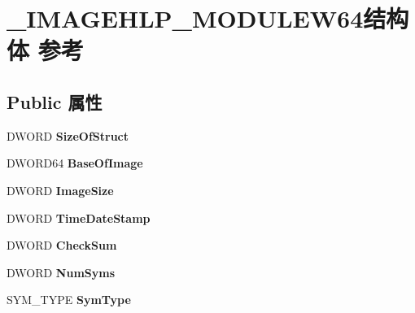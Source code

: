 \hypertarget{struct___i_m_a_g_e_h_l_p___m_o_d_u_l_e_w64}{}\section{\+\_\+\+I\+M\+A\+G\+E\+H\+L\+P\+\_\+\+M\+O\+D\+U\+L\+E\+W64结构体 参考}
\label{struct___i_m_a_g_e_h_l_p___m_o_d_u_l_e_w64}
\subsection*{Public 属性}
\begin{DoxyCompactItemize}
\item 
\mbox{\label{struct___i_m_a_g_e_h_l_p___m_o_d_u_l_e_w64_ab812c0a493e00128ab76d621ffeb0474}} 
D\+W\+O\+RD {\bfseries Size\+Of\+Struct}
\item 
\mbox{\label{struct___i_m_a_g_e_h_l_p___m_o_d_u_l_e_w64_a8704569ac2261a476dc1ac2baeec65ce}} 
D\+W\+O\+R\+D64 {\bfseries Base\+Of\+Image}
\item 
\mbox{\label{struct___i_m_a_g_e_h_l_p___m_o_d_u_l_e_w64_af1ce848a5654f2092c929f284c69eef4}} 
D\+W\+O\+RD {\bfseries Image\+Size}
\item 
\mbox{\label{struct___i_m_a_g_e_h_l_p___m_o_d_u_l_e_w64_a11f655c5c3c6e07af9face3907666fa6}} 
D\+W\+O\+RD {\bfseries Time\+Date\+Stamp}
\item 
\mbox{\label{struct___i_m_a_g_e_h_l_p___m_o_d_u_l_e_w64_a0ba4447ccb63ec975cf06fbfdae3dc8a}} 
D\+W\+O\+RD {\bfseries Check\+Sum}
\item 
\mbox{\label{struct___i_m_a_g_e_h_l_p___m_o_d_u_l_e_w64_aa315b89dce47e9e5509b36187d8685f2}} 
D\+W\+O\+RD {\bfseries Num\+Syms}
\item 
\mbox{\label{struct___i_m_a_g_e_h_l_p___m_o_d_u_l_e_w64_ae82c68b94400a32ab057940ff8e733e2}} 
S\+Y\+M\+\_\+\+T\+Y\+PE {\bfseries Sym\+Type}

\end{DoxyCompactItemize}
